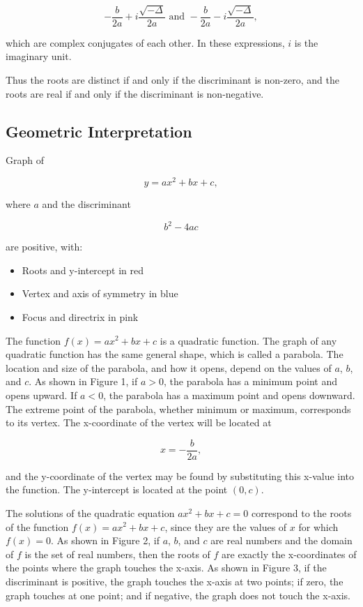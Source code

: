   \[
-\frac{b}{2a} + i \frac{\sqrt{-\Delta}}{2a} \text{ and } -\frac{b}{2a} - i \frac{\sqrt{-\Delta}}{2a},
\]

   which are complex conjugates of each other. In these expressions, $i$ is the imaginary unit.

Thus the roots are distinct if and only if the discriminant is non-zero, and the roots are
real if and only if the discriminant is non-negative.

\subsection{Geometric Interpretation}
\label{sss:geom-084c}

Graph of

\[
y = ax^2 + bx + c,
\] 

where $a$ and the discriminant 

\[
b^2 - 4ac
\] 

are positive, with:

\begin{itemize}
    \item Roots and y-intercept in red
    \item Vertex and axis of symmetry in blue
    \item Focus and directrix in pink
\end{itemize}


The function $f(x) = ax^2 + bx + c$ is a quadratic function. The graph of any quadratic function has the same general shape, which is called a parabola. The location and size of the parabola, and how it opens, depend on the values of $a$, $b$, and $c$. As shown in Figure 1, if $a > 0$, the parabola has a minimum point and opens upward. If $a < 0$, the parabola has a maximum point and opens downward. The extreme point of the parabola, whether minimum or maximum, corresponds to its vertex. The x-coordinate of the vertex will be located at 

\[
x = -\frac{b}{2a},
\] 

and the y-coordinate of the vertex may be found by substituting this x-value into the function. The y-intercept is located at the point $(0, c)$.

The solutions of the quadratic equation $ax^2 + bx + c = 0$ correspond to the roots of the function $f(x) = ax^2 + bx + c$, since they are the values of $x$ for which $f(x) = 0$. As shown in Figure 2, if $a$, $b$, and $c$ are real numbers and the domain of $f$ is the set of real numbers, then the roots of $f$ are exactly the x-coordinates of the points where the graph touches the x-axis. As shown in Figure 3, if the discriminant is positive, the graph touches the x-axis at two points; if zero, the graph touches at one point; and if negative, the graph does not touch the x-axis.

